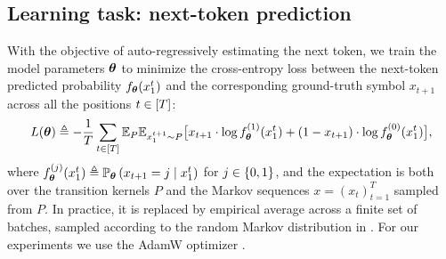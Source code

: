 \subsection{Learning task: next-token prediction}
With the objective of auto-regressively estimating the next token,  we train the model parameters $\boldsymbol{\theta}$ to minimize the cross-entropy loss between the next-token predicted probability $f_{\boldsymbol{\theta}}(x_1^t)$ and the corresponding ground-truth symbol $x_{t+1}$ across all the positions $t \in [T]$:
\begin{equation}
L(\boldsymbol{\theta}) \triangleq -\frac{1}{T} \sum_{t \in [T]} \mathbb{E}_P \mathbb{E}_{x_1^{t+1} \sim P}\big[x_{t+1} \cdot \log f_{\boldsymbol{\theta}}^{(1)} (x_1^t) + (1- x_{t+1}) \cdot \log f_{\boldsymbol{\theta}}^{(0)}(x_1^t) \big],
\label{eq:loss}
\end{equation}
where $f_{\boldsymbol{\theta}}^{(j)} (x_1^t) \triangleq \mathbb{P}_{\boldsymbol{\theta}}\left( x_{t+1}=j \mid x_1^t \right)$ for $j\in\{0,1\}$, and the expectation is both over the transition kernels $P$ and the Markov sequences $x= (x_t)_{t=1}^T$ sampled from $P$. In practice, it is replaced
by empirical average across a finite set of batches, sampled according to the random Markov distribution in . For our experiments we use the AdamW optimizer \cite{Kingma2017}. 

